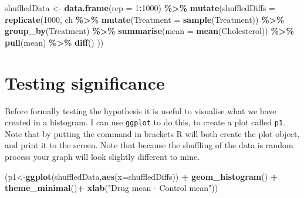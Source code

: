 \documentclass[
  a4paperpaper,
]{book}
\newenvironment{Shaded}{\begin{snugshade}}{\end{snugshade}}
\newcommand{\DataTypeTok}[1]{\textcolor[rgb]{0.13,0.29,0.53}{#1}}
\newcommand{\DecValTok}[1]{\textcolor[rgb]{0.00,0.00,0.81}{#1}}
\newcommand{\KeywordTok}[1]{\textcolor[rgb]{0.13,0.29,0.53}{\textbf{#1}}}
\newcommand{\NormalTok}[1]{#1}
\newcommand{\OperatorTok}[1]{\textcolor[rgb]{0.81,0.36,0.00}{\textbf{#1}}}
\newcommand{\StringTok}[1]{\textcolor[rgb]{0.31,0.60,0.02}{#1}}
\begin{document}
\begin{Shaded}
\begin{Highlighting}[]
\NormalTok{shuffledData \textless{}{-}}\StringTok{ }\KeywordTok{data.frame}\NormalTok{(}\DataTypeTok{rep =} \DecValTok{1}\OperatorTok{:}\DecValTok{1000}\NormalTok{) }\OperatorTok{\%\textgreater{}\%}
\StringTok{  }\KeywordTok{mutate}\NormalTok{(}\DataTypeTok{shuffledDiffs =} \KeywordTok{replicate}\NormalTok{(}\DecValTok{1000}\NormalTok{,}
\NormalTok{            ch }\OperatorTok{\%\textgreater{}\%}
\StringTok{            }\KeywordTok{mutate}\NormalTok{(}\DataTypeTok{Treatment =} \KeywordTok{sample}\NormalTok{(Treatment)) }\OperatorTok{\%\textgreater{}\%}
\StringTok{            }\KeywordTok{group\_by}\NormalTok{(Treatment) }\OperatorTok{\%\textgreater{}\%}
\StringTok{            }\KeywordTok{summarise}\NormalTok{(}\DataTypeTok{mean =} \KeywordTok{mean}\NormalTok{(Cholesterol)) }\OperatorTok{\%\textgreater{}\%}
\StringTok{            }\KeywordTok{pull}\NormalTok{(mean) }\OperatorTok{\%\textgreater{}\%}
\StringTok{            }\KeywordTok{diff}\NormalTok{()}
\NormalTok{            ))}
\end{Highlighting}
\end{Shaded}

\hypertarget{testing-significance}{%
\section{Testing significance}\label{testing-significance}}

Before formally testing the hypothesis it is useful to visualise what we have created in a histogram. I can use \texttt{ggplot} to do this, to create a plot called \texttt{p1}. Note that by putting the command in brackets R will both create the plot object, and print it to the screen. Note that because the shuffling of the data is random process your graph will look slightly different to mine.

\begin{Shaded}
\begin{Highlighting}[]
\NormalTok{(p1\textless{}{-}}\KeywordTok{ggplot}\NormalTok{(shuffledData,}\KeywordTok{aes}\NormalTok{(}\DataTypeTok{x=}\NormalTok{shuffledDiffs)) }\OperatorTok{+}\StringTok{ }
\StringTok{  }\KeywordTok{geom\_histogram}\NormalTok{() }\OperatorTok{+}\StringTok{ }
\StringTok{  }\KeywordTok{theme\_minimal}\NormalTok{()}\OperatorTok{+}
\StringTok{  }\KeywordTok{xlab}\NormalTok{(}\StringTok{"Drug mean {-} Control mean"}\NormalTok{))}
\end{Highlighting}
\end{Shaded}
\end{document}
